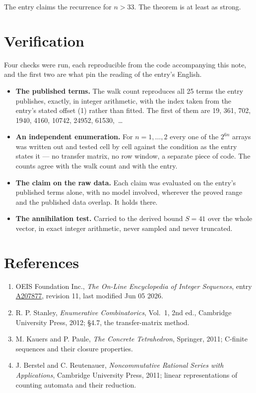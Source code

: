 \documentclass[11pt]{article}
\theoremstyle{definition}
\begin{document}
The entry claims the recurrence for $n > 33$. The theorem is at least as strong.

\section{Verification}

Four checks were run, each reproducible from the code accompanying this note, and the first two are what pin the reading of the entry's English.

\begin{itemize}

\item {\bfseries The published terms.} The walk count reproduces all 25 terms the entry publishes, exactly, in integer arithmetic, with the index taken from the entry's stated offset (1) rather than fitted. The first of them are 19, 361, 702, 1940, 4160, 10742, 24952, 61530,~\dots

\item {\bfseries An independent enumeration.} For $n = 1,\dots,2$ every one of the $2^{6n}$ arrays was written out and tested cell by cell against the condition as the entry states it --- no transfer matrix, no row window, a separate piece of code. The counts agree with the walk count and with the entry.

\item {\bfseries The claim on the raw data.} Each claim was evaluated on the entry's published terms alone, with no model involved, wherever the proved range and the published data overlap. It holds there.

\item {\bfseries The annihilation test.} Carried to the derived bound $S = 41$ over the whole vector, in exact integer arithmetic, never sampled and never truncated.

\end{itemize}

\section{References}

\begin{enumerate}

\item OEIS Foundation Inc., \emph{The On-Line Encyclopedia of Integer Sequences}, entry \href{https://oeis.org/A207877}{A207877}, revision 11, last modified Jun 05 2026.

\item R. P. Stanley, \emph{Enumerative Combinatorics}, Vol.~1, 2nd ed., Cambridge University Press, 2012; \S4.7, the transfer-matrix method.

\item M. Kauers and P. Paule, \emph{The Concrete Tetrahedron}, Springer, 2011; C-finite sequences and their closure properties.

\item J. Berstel and C. Reutenauer, \emph{Noncommutative Rational Series with Applications}, Cambridge University Press, 2011; linear representations of counting automata and their reduction.

\end{enumerate}
\end{document}
